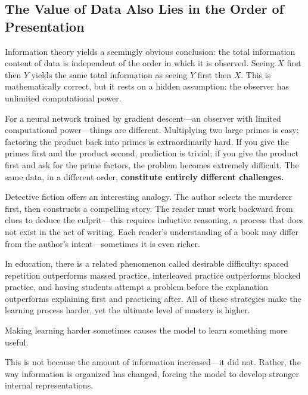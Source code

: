 \newpage
\subsection{The Value of Data Also Lies in the Order of Presentation}

Information theory yields a seemingly obvious conclusion: the total information content of data is independent of the order in which it is observed. Seeing $X$ first then $Y$ yields the same total information as seeing $Y$ first then $X$. This is mathematically correct, but it rests on a hidden assumption: the observer has unlimited computational power.

\vspace{1em}

For a neural network trained by gradient descent---an observer with limited computational power---things are different. Multiplying two large primes is easy; factoring the product back into primes is extraordinarily hard. If you give the primes first and the product second, prediction is trivial; if you give the product first and ask for the prime factors, the problem becomes extremely difficult. The same data, in a different order, \textbf{constitute entirely different challenges.}

\vspace{1em}

Detective fiction offers an interesting analogy. The author selects the murderer first, then constructs a compelling story. The reader must work backward from clues to deduce the culprit---this requires inductive reasoning, a process that does not exist in the act of writing. Each reader's understanding of a book may differ from the author's intent---sometimes it is even richer.

\vspace{1em}

In education, there is a related phenomenon called desirable difficulty: spaced repetition outperforms massed practice, interleaved practice outperforms blocked practice, and having students attempt a problem before the explanation outperforms explaining first and practicing after. All of these strategies make the learning process harder, yet the ultimate level of mastery is higher.

\vspace{1em}

Making learning harder sometimes causes the model to learn something more useful.

This is not because the amount of information increased---it did not. Rather, the way information is organized has changed, forcing the model to develop stronger internal representations.

